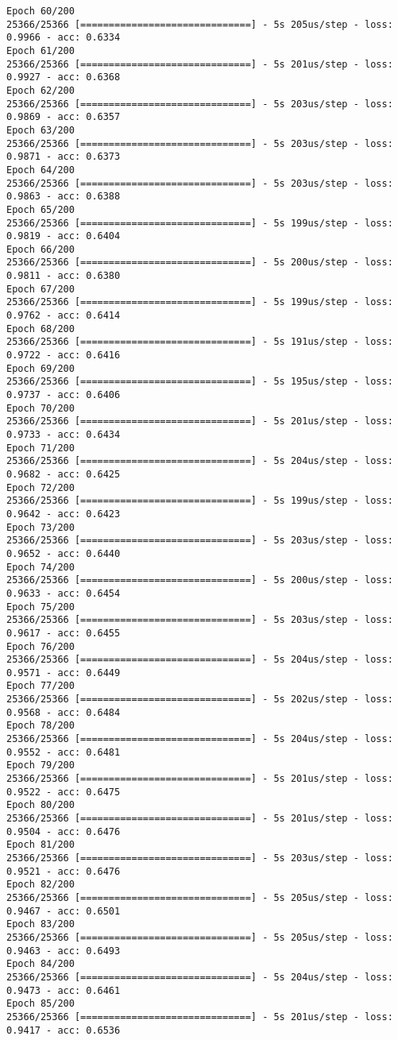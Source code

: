\documentclass[11pt]{article}
\begin{document}
\begin{Verbatim}[commandchars=\\\{\}]
Epoch 60/200
25366/25366 [==============================] - 5s 205us/step - loss: 0.9966 - acc: 0.6334
Epoch 61/200
25366/25366 [==============================] - 5s 201us/step - loss: 0.9927 - acc: 0.6368
Epoch 62/200
25366/25366 [==============================] - 5s 203us/step - loss: 0.9869 - acc: 0.6357
Epoch 63/200
25366/25366 [==============================] - 5s 203us/step - loss: 0.9871 - acc: 0.6373
Epoch 64/200
25366/25366 [==============================] - 5s 203us/step - loss: 0.9863 - acc: 0.6388
Epoch 65/200
25366/25366 [==============================] - 5s 199us/step - loss: 0.9819 - acc: 0.6404
Epoch 66/200
25366/25366 [==============================] - 5s 200us/step - loss: 0.9811 - acc: 0.6380
Epoch 67/200
25366/25366 [==============================] - 5s 199us/step - loss: 0.9762 - acc: 0.6414
Epoch 68/200
25366/25366 [==============================] - 5s 191us/step - loss: 0.9722 - acc: 0.6416
Epoch 69/200
25366/25366 [==============================] - 5s 195us/step - loss: 0.9737 - acc: 0.6406
Epoch 70/200
25366/25366 [==============================] - 5s 201us/step - loss: 0.9733 - acc: 0.6434
Epoch 71/200
25366/25366 [==============================] - 5s 204us/step - loss: 0.9682 - acc: 0.6425
Epoch 72/200
25366/25366 [==============================] - 5s 199us/step - loss: 0.9642 - acc: 0.6423
Epoch 73/200
25366/25366 [==============================] - 5s 203us/step - loss: 0.9652 - acc: 0.6440
Epoch 74/200
25366/25366 [==============================] - 5s 200us/step - loss: 0.9633 - acc: 0.6454
Epoch 75/200
25366/25366 [==============================] - 5s 203us/step - loss: 0.9617 - acc: 0.6455
Epoch 76/200
25366/25366 [==============================] - 5s 204us/step - loss: 0.9571 - acc: 0.6449
Epoch 77/200
25366/25366 [==============================] - 5s 202us/step - loss: 0.9568 - acc: 0.6484
Epoch 78/200
25366/25366 [==============================] - 5s 204us/step - loss: 0.9552 - acc: 0.6481
Epoch 79/200
25366/25366 [==============================] - 5s 201us/step - loss: 0.9522 - acc: 0.6475
Epoch 80/200
25366/25366 [==============================] - 5s 201us/step - loss: 0.9504 - acc: 0.6476
Epoch 81/200
25366/25366 [==============================] - 5s 203us/step - loss: 0.9521 - acc: 0.6476
Epoch 82/200
25366/25366 [==============================] - 5s 205us/step - loss: 0.9467 - acc: 0.6501
Epoch 83/200
25366/25366 [==============================] - 5s 205us/step - loss: 0.9463 - acc: 0.6493
Epoch 84/200
25366/25366 [==============================] - 5s 204us/step - loss: 0.9473 - acc: 0.6461
Epoch 85/200
25366/25366 [==============================] - 5s 201us/step - loss: 0.9417 - acc: 0.6536

\end{Verbatim}
\end{document}
